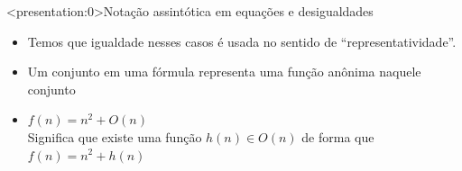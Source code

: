 \documentclass{beamer}
\newcounter{saveenumi}
\newcommand{\conti}{\setcounter{enumi}{\value{saveenumi}}}
\begin{document}
%
%
%
%

\begin{frame}<presentation:0>{Notação assintótica em equações e desigualdades}
   \begin{itemize}
    \item Temos que igualdade nesses casos é usada no sentido de ``representatividade''.
    \item Um conjunto em uma fórmula representa uma função anônima naquele conjunto
    \end{itemize}
    \begin{block}{}
     \begin{itemize}
      \item $ f(n) = n^2 + O(n)$\\
      Significa que existe uma função $h(n) \in O(n)$ de forma que $f(n) = n^2 + h(n)$
     \end{itemize}
    \end{block}


\end{frame}
\end{document}
